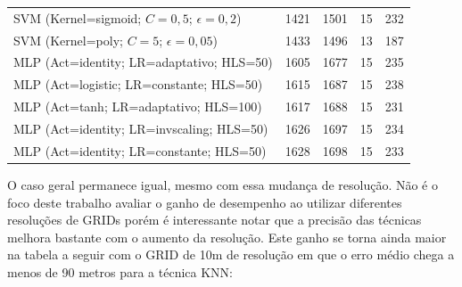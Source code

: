 \documentclass[12pt]{article}
\begin{document}
\begin{center}
\begin{longtable}{|l|l|l|l|l|}
        SVM (Kernel=sigmoid; $C=0,5$; $\epsilon=0,2$) & 1421 & 1501 & 15 & 232 \\
        SVM (Kernel=poly; $C=5$; $\epsilon=0,05$) & 1433 & 1496 & 13 & 187 \\
        \hline
        MLP (Act=identity; LR=adaptativo; HLS=50) & 1605 & 1677 & 15 & 235 \\
        MLP (Act=logistic; LR=constante; HLS=50) & 1615 & 1687 & 15 & 238 \\
        MLP (Act=tanh; LR=adaptativo; HLS=100) & 1617 & 1688 & 15 & 231 \\
        MLP (Act=identity; LR=invscaling; HLS=50) & 1626 & 1697 & 15 & 234 \\
        MLP (Act=identity; LR=constante; HLS=50) & 1628 & 1698 & 15 & 233 \\
        \end{longtable}
        \end{center}
        
        O caso geral permanece igual, mesmo com essa mudança de resolução. Não é o foco deste trabalho avaliar o ganho de desempenho ao utilizar diferentes resoluções de GRIDs porém é interessante notar que a precisão das técnicas melhora bastante com o aumento da resolução. Este ganho se torna ainda maior na tabela a seguir com o GRID de 10m de resolução em que o erro médio chega a menos de 90 metros para a técnica KNN:
        
\end{document}
